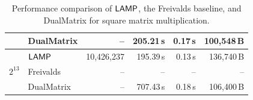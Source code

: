 \begin{table}[!t]
\begin{revblock}[unbreakable]
\begin{tabular*}{\linewidth}{@{\extracolsep{\fill}}clrrrr@{}}
           & DualMatrix & -- & 205.21\,s & 0.17\,s & 100{,}548\,B \\
\midrule
\multirow{3}{*}{$2^{13}$} & \(\textsf{LAMP}\) & 10{,}426{,}237 & 195.39\,s & 0.13\,s & 136{,}740\,B \\
           & Freivalds & -- & -- & -- & -- \\
           & DualMatrix & -- & 707.43\,s & 0.18\,s & 106{,}400\,B \\
\bottomrule
\end{tabular*}
\end{revblock}
\vspace{6pt}
\caption{Performance comparison of \(\textsf{LAMP}\), the Freivalds baseline, and DualMatrix for square matrix multiplication.}
\label{tab:matmul-comparison}
\end{table}


\subsection[Comparison with Matrix-Multiplication Proof Systems]
  {}
  \label{sec:eval-matmul-comparison}

